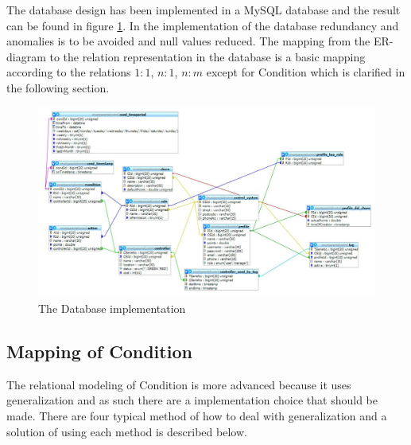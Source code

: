 The database design has been implemented in a MySQL database and the result can be found in figure \ref{fig:databaseDiagram}. In the implementation of the database redundancy and anomalies is to be avoided and null values reduced. 
The mapping from the ER-diagram to the relation representation in the database is a basic mapping according to the relations $1:1$, $n:1$, $n:m$ except for Condition which is clarified in the following section. \citep{DatabaseKilde}

\begin{figure}
	\centering
		\includegraphics[width=1.50\textwidth,  angle=90]{images/databaseDiagram.jpg}
	\caption{The Database implementation}
	\label{fig:databaseDiagram}
\end{figure}

\subsection{Mapping of Condition}
\label{subsec:mappRule}
The relational modeling of Condition is more advanced because it uses generalization and as such there are a implementation choice that should be made. There are four typical method of how to deal with generalization and a solution of using each method is described below.\citep{DatabaseKilde}

